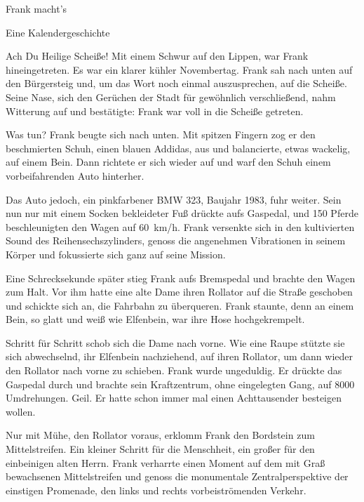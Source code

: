\documentclass [a4paper, 11pt] {article}
\begin{document}
\begin{center}
{\sf\LARGE Frank macht's}
\par\medskip
{\sf Eine Kalendergeschichte}
\end{center}\par

\noindent Ach Du Heilige Scheiße! Mit einem Schwur auf den Lippen, war Frank hineingetreten. Es war ein klarer kühler Novembertag. Frank sah nach unten auf den Bürgersteig und, um das Wort noch einmal auszusprechen, auf die Scheiße. Seine Nase, sich den Gerüchen der Stadt für gewöhnlich verschließend, nahm Witterung auf und bestätigte: Frank war voll in die Scheiße getreten.

Was tun? Frank beugte sich nach unten. Mit spitzen Fingern zog er den beschmierten Schuh, einen blauen Addidas, aus und balancierte, etwas wackelig, auf einem Bein. Dann richtete er sich wieder auf und warf den Schuh einem vorbeifahrenden Auto hinterher. 

Das Auto jedoch, ein pinkfarbener BMW 323, Baujahr 1983, fuhr weiter. Sein nun nur mit einem Socken bekleideter Fuß drückte aufs Gaspedal, und 150 Pferde beschleunigten den Wagen auf \SI{60}{\km/\hour}. Frank versenkte sich in den kultivierten Sound des Reihensechszylinders, genoss die angenehmen Vibrationen in seinem Körper und fokussierte sich ganz auf seine Mission. 

Eine Schrecksekunde später stieg Frank aufs Bremspedal und brachte den Wagen zum Halt. Vor ihm hatte eine alte Dame ihren Rollator auf die Straße geschoben und schickte sich an, die Fahrbahn zu überqueren. Frank staunte, denn an einem Bein, so glatt und weiß wie Elfenbein, war ihre Hose hochgekrempelt. 

Schritt für Schritt schob sich die Dame nach vorne. Wie eine Raupe stützte sie sich abwechselnd, ihr Elfenbein nachziehend, auf ihren Rollator, um dann wieder den Rollator nach vorne zu schieben. Frank wurde ungeduldig. Er drückte das Gaspedal durch und brachte sein Kraftzentrum, ohne eingelegten Gang, auf 8000 Umdrehungen. Geil. Er hatte schon immer mal einen Achttausender besteigen wollen.

Nur mit Mühe, den Rollator voraus, erklomm Frank den Bordstein zum Mittelstreifen. Ein kleiner Schritt für die Menschheit, ein großer für den einbeinigen alten Herrn. Frank verharrte einen Moment auf dem mit Graß bewachsenen Mittelstreifen und genoss die monumentale Zentralperspektive der einstigen Promenade, den links und rechts vorbeiströmenden Verkehr.
\end{document}
